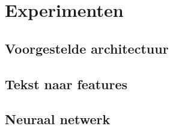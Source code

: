 \chapter{Experimenten}

\section{Voorgestelde architectuur}

\section{Tekst naar features}

\section{Neuraal netwerk}
